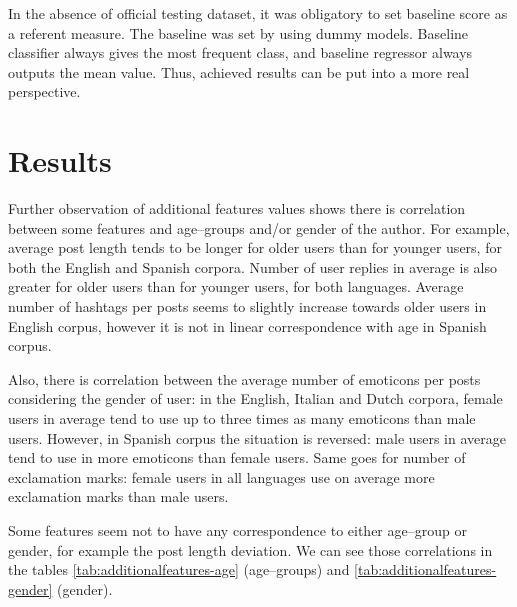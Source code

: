 \documentclass[10pt, a4paper]{article}
\begin{document}
In the absence of official testing dataset, it was obligatory to set baseline score as a referent measure.
The baseline was set by using dummy models.
Baseline classifier always gives the most frequent class, and baseline regressor always outputs the mean value.
Thus, achieved results can be put into a more real perspective.

\section{Results}
\label{sec:results}

Further observation of additional features values shows there is correlation between some features and age--groups and/or gender of the author.
For example, average post length tends to be longer for older users than for younger users, for both the English and Spanish corpora.
Number of user replies in average is also greater for older users than for younger users, for both languages.
Average number of hashtags per posts seems to slightly increase towards older users in English corpus, however it is not in linear correspondence with age in Spanish corpus.

Also, there is correlation between the average number of emoticons per posts considering the gender of user: in the English, Italian and Dutch corpora, female users in average tend to use up to three times as many emoticons than male users.
However, in Spanish corpus the situation is reversed: male users in average tend to use in more emoticons than female users.
Same goes for number of exclamation marks: female users in all languages use on average more exclamation marks than male users.

Some features seem not to have any correspondence to either age--group or gender, for example the post length deviation.
We can see those correlations in the tables \ref{tab:additionalfeatures-age} (age--groups) and \ref{tab:additionalfeatures-gender} (gender).
\end{document}
